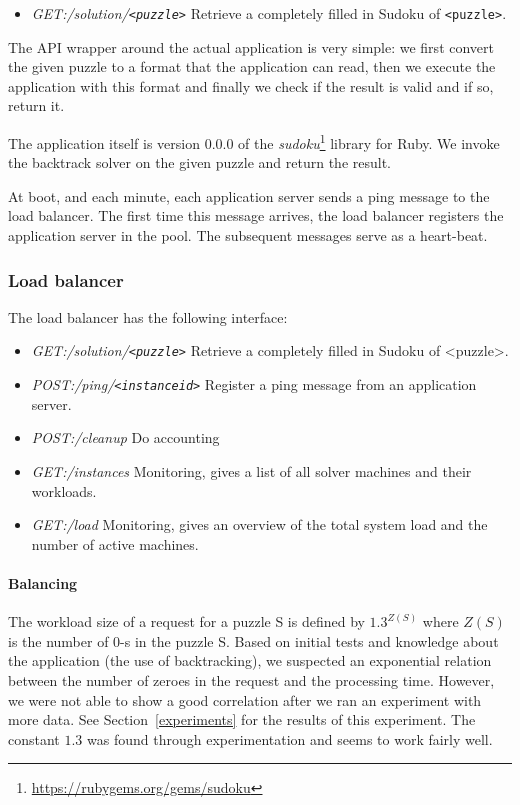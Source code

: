 		\begin{itemize}
			\item \emph{GET:/solution/\texttt{<puzzle>}} Retrieve a completely filled in Sudoku of \texttt{<puzzle>}.
		\end{itemize}

		The API wrapper around the actual application is very simple:
		we first convert the given puzzle to a format that the application can read, then we execute the application with this format and finally we check if the result is valid and if so, return it.

		The application itself is version 0.0.0 of the \textit{sudoku}\footnote{\url{https://rubygems.org/gems/sudoku}} library for Ruby.
		We invoke the backtrack solver on the given puzzle and return the result.
		
		At boot, and each minute, each application server sends a ping message to the load balancer.
		The first time this message arrives, the load balancer registers the application server in the pool.
		The subsequent messages serve as a heart-beat.
	\subsubsection{Load balancer}
		\label{sys:arch:load}

		The load balancer has the following interface:
		\begin{itemize}
			\item \emph{GET:/solution/\texttt{<puzzle>}} Retrieve a completely filled in Sudoku of <puzzle>.
			\item \emph{POST:/ping/\texttt{<instanceid>}} Register a ping message from an application server.
			\item \emph{POST:/cleanup} Do accounting
			\item \emph{GET:/instances} Monitoring, gives a list of all solver machines and their workloads.
			\item \emph{GET:/load} Monitoring, gives an overview of the total system load and the number of active machines.
		\end{itemize}
		
		\paragraph{Balancing}
			The workload size of a request for a puzzle S is defined by $1.3^{Z(S)}$ where $Z(S)$ is the number of 0-s in the puzzle S.
			Based on initial tests and knowledge about the application (the use of backtracking), we suspected an exponential relation between the number of zeroes in the request and the processing time.
			However, we were not able to show a good correlation after we ran an experiment with more data.
			See Section~\ref{experiments} for the results of this experiment.
			The constant $1.3$ was found through experimentation and seems to work fairly well.
			
